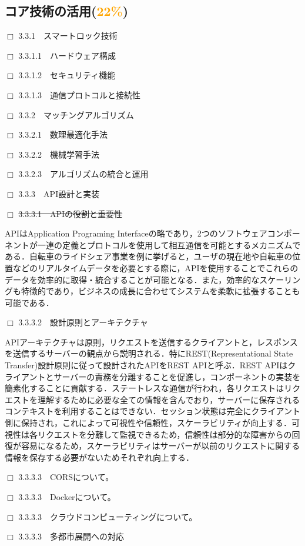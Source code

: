   \subsection{コア技術の活用(\textcolor{orange}{22\%})}
    \label{sec:コア技術の活用}
      \par $\Box$ 3.3.1　スマートロック技術
      \par $\Box$ 3.3.1.1　ハードウェア構成
      \par $\Box$ 3.3.1.2　セキュリティ機能
      \par $\Box$ 3.3.1.3　通信プロトコルと接続性
      \par $\Box$ 3.3.2　マッチングアルゴリズム
      \par $\Box$ 3.3.2.1　数理最適化手法
      \par $\Box$ 3.3.2.2　機械学習手法
      \par $\Box$ 3.3.2.3　アルゴリズムの統合と運用
      \par $\Box$ 3.3.3　API設計と実装
      \par $\Box$ \sout{3.3.3.1　APIの役割と重要性}
      \par APIはApplication Programing Interfaceの略であり，2つのソフトウェアコンポーネントが一連の定義とプロトコルを使用して相互通信を可能とするメカニズムである．自転車のライドシェア事業を例に挙げると，ユーザの現在地や自転車の位置などのリアルタイムデータを必要とする際に，APIを使用することでこれらのデータを効率的に取得・統合することが可能となる．また，効率的なスケーリングも特徴的であり，ビジネスの成長に合わせてシステムを柔軟に拡張することも可能である．
      \par $\Box$ 3.3.3.2　設計原則とアーキテクチャ
      \par APIアーキテクチャは原則，リクエストを送信するクライアントと，レスポンスを送信するサーバーの観点から説明される．特にREST(Representational State Transfer)設計原則に従って設計されたAPIをREST APIと呼ぶ．REST APIはクライアントとサーバーの責務を分離することを促進し，コンポーネントの実装を簡素化することに貢献する．ステートレスな通信が行われ，各リクエストはリクエストを理解するために必要な全ての情報を含んでおり，サーバーに保存されるコンテキストを利用することはできない．セッション状態は完全にクライアント側に保持され，これによって可視性や信頼性，スケーラビリティが向上する．可視性は各リクエストを分離して監視できるため，信頼性は部分的な障害からの回復が容易になるため，スケーラビリティはサーバーが以前のリクエストに関する情報を保存する必要がないためそれぞれ向上する．
      \par $\Box$ 3.3.3.3　CORSについて。
      \par $\Box$ 3.3.3.3　Dockerについて。
      \par $\Box$ 3.3.3.3　クラウドコンピューティングについて。
      \par $\Box$ 3.3.3.3　多都市展開への対応
      
